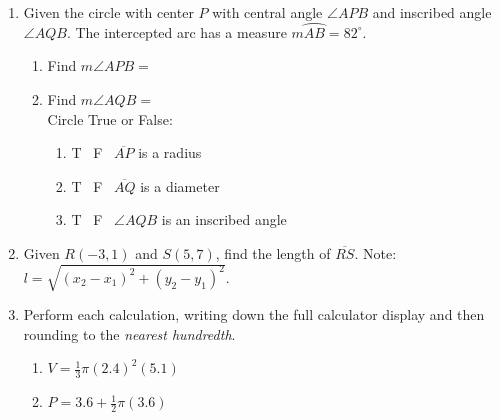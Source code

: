 \documentclass[12pt, twoside]{article}
\begin{document}
\begin{enumerate}
    \item Given the circle with center $P$ with central angle $\angle APB$ and inscribed angle $\angle AQB$. The intercepted arc has a measure $m \wideparen{AB}=82^\circ$.
  \begin{multicols}{2}
    \raggedcolumns
    \begin{enumerate}
      \item Find $m\angle APB=$ \vspace{0.7cm}
      \item Find $m\angle AQB=$ \vspace{0.7cm}\\
      Circle True or False:
      \begin{enumerate}[itemsep=0.3cm]
        \item T \, F \, $\overline{AP}$ is a radius
        \item T \, F \, $\overline{AQ}$ is a diameter
        \item T \, F \, $\angle AQB$ is an inscribed angle
      \end{enumerate}
    \end{enumerate}
  \end{multicols} \vspace{0.5cm}

  \item Given $R(-3,1)$ and $S(5,7)$, find the length of $\overline{RS}$. Note: $l=\sqrt{(x_2-x_1)^2+(y_2-y_1)^2}$. %
  
\newpage
  \item Perform each calculation, writing down the full calculator display and then rounding to the \emph{nearest hundredth}.
  \begin{multicols}{2}
  \begin{enumerate}
    \item $V=\frac{1}{3} \pi (2.4)^2(5.1)$
    \item $P=3.6 + \frac{1}{2} \pi (3.6)$  
  \end{enumerate}
  \end{multicols}\vspace{2cm}


\end{enumerate}
\end{document}
